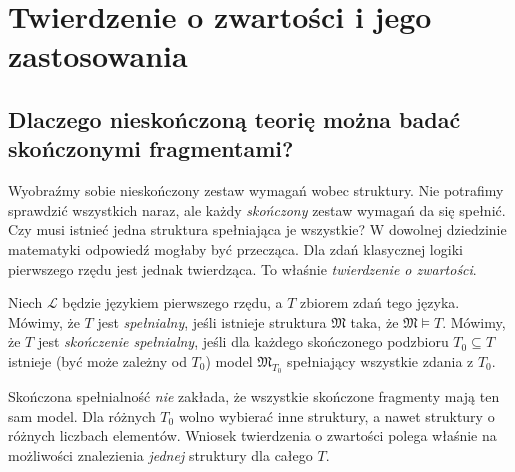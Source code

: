 \chapter{Twierdzenie o zwartości i jego zastosowania}\label{ch:compactness}

\section{Dlaczego nieskończoną teorię można badać skończonymi fragmentami?}
Wyobraźmy sobie nieskończony zestaw wymagań wobec struktury. Nie potrafimy sprawdzić wszystkich naraz, ale każdy \emph{skończony} zestaw wymagań da się spełnić. Czy musi istnieć jedna struktura spełniająca je wszystkie? W dowolnej dziedzinie matematyki odpowiedź mogłaby być przecząca. Dla zdań klasycznej logiki pierwszego rzędu jest jednak twierdząca. To właśnie \emph{twierdzenie o zwartości}.

\begin{definicja}\label{def:compactness-finite-satisfiability}
Niech $\mathcal L$ będzie językiem pierwszego rzędu, a $T$ zbiorem zdań tego języka. Mówimy, że $T$ jest \emph{spełnialny}, jeśli istnieje struktura $\mathfrak M$ taka, że $\mathfrak M\models T$. Mówimy, że $T$ jest \emph{skończenie spełnialny}, jeśli dla każdego skończonego podzbioru $T_0\subseteq T$ istnieje (być może zależny od $T_0$) model $\mathfrak M_{T_0}$ spełniający wszystkie zdania z $T_0$.
\end{definicja}

\begin{uwaga}
Skończona spełnialność \emph{nie} zakłada, że wszystkie skończone fragmenty mają ten sam model. Dla różnych $T_0$ wolno wybierać inne struktury, a nawet struktury o różnych liczbach elementów. Wniosek twierdzenia o zwartości polega właśnie na możliwości znalezienia \emph{jednej} struktury dla całego $T$.
\end{uwaga}

